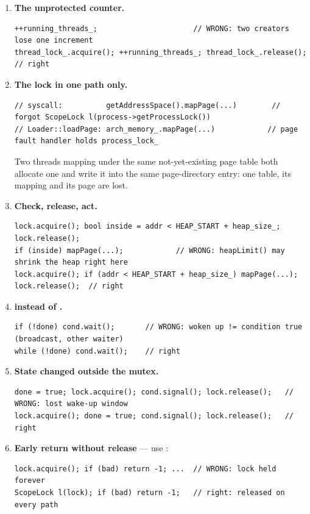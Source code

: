 \begin{enumerate}
\item \textbf{The unprotected counter.}
\begin{lstlisting}[style=cpp]
++running_threads_;                      // WRONG: two creators lose one increment
thread_lock_.acquire(); ++running_threads_; thread_lock_.release();   // right
\end{lstlisting}

\item \textbf{The lock in one path only.}
\begin{lstlisting}[style=cpp]
// syscall:          getAddressSpace().mapPage(...)        // forgot ScopeLock l(process->getProcessLock())
// Loader::loadPage: arch_memory_.mapPage(...)            // page fault handler holds process_lock_
\end{lstlisting}
Two threads mapping under the same not-yet-existing page table both allocate one and write
it into the same page-directory entry: one table, its mapping and its page are lost.

\item \textbf{Check, release, act.}
\begin{lstlisting}[style=cpp]
lock.acquire(); bool inside = addr < HEAP_START + heap_size_; lock.release();
if (inside) mapPage(...);            // WRONG: heapLimit() may shrink the heap right here
lock.acquire(); if (addr < HEAP_START + heap_size_) mapPage(...); lock.release();  // right
\end{lstlisting}

\item \textbf{ instead of .}
\begin{lstlisting}[style=cpp]
if (!done) cond.wait();       // WRONG: woken up != condition true (broadcast, other waiter)
while (!done) cond.wait();    // right
\end{lstlisting}

\item \textbf{State changed outside the mutex.}
\begin{lstlisting}[style=cpp]
done = true; lock.acquire(); cond.signal(); lock.release();   // WRONG: lost wake-up window
lock.acquire(); done = true; cond.signal(); lock.release();   // right
\end{lstlisting}

\item \textbf{Early return without release} --- use :
\begin{lstlisting}[style=cpp]
lock.acquire(); if (bad) return -1; ...  // WRONG: lock held forever
ScopeLock l(lock); if (bad) return -1;   // right: released on every path
\end{lstlisting}


\end{enumerate}
